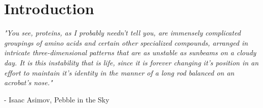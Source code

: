 \chapter{Introduction}
\label{introchap}

\pagestyle{fancy}


\fancyhf{}
\fancyfoot[RO,LE]{\thepage}

\setcounter{page}{1}

\renewcommand{\epigraphflush}{center}
\renewcommand{\textflush}{flushepinormal}
\setlength{\epigraphwidth}{0.8\textwidth}
\setlength{\epigraphrule}{0pt}
\setlength{\beforeepigraphskip}{0.8 cm}
\setlength{\afterepigraphskip}{0.8 cm}

\makeatletter
\renewcommand{\@epitext}[1]{%
  \begin{minipage}{\epigraphwidth}\begin{\textflush} \hspace*{20pt}#1\\
    \ifdim\epigraphrule>\z@ \@epirule \else \vspace*{-.5\baselineskip} \fi
  \end{\textflush}\end{minipage}}
\makeatother

\epigraph{\textit{"You see, proteins, as I probably needn't tell you, are immensely complicated groupings of amino acids and certain other specialized compounds, arranged in intricate three-dimensional patterns that are as unstable as sunbeams on a cloudy
day. It is this instability that is life, since it is forever changing it's position in
an effort to maintain it's identity in the manner of a long rod balanced on an
acrobat's nose."}}{ - Isaac Asimov, Pebble in the Sky}

